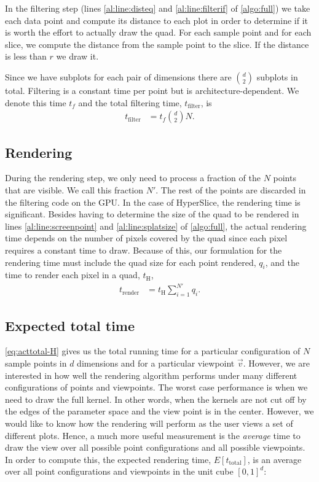 In the filtering step (lines \autoref{al:line:disteq} and 
\autoref{al:line:filterif} of \autoref{algo:full}) we take each data
point and compute its distance to each plot in order to determine if it is
worth the effort to actually draw the quad. For each sample point and for each
slice, we compute the distance from the sample point to the slice. If the
distance is less than $r$ we draw it.

Since we have subplots for each pair of dimensions there are
${d \choose 2}$ subplots in total. Filtering is a constant time per point
but is
architecture-dependent. We denote this time $t_f$ and the total 
filtering time, $t_\text{filter}$, is
\begin{align}
  t_\text{filter} &= t_f {d \choose 2} N \text{.}
\end{align}

\subsection{Rendering}
\label{rendering}

During the rendering step, we only need to process a fraction of the $N$ points
that are visible. We call this fraction $N'$. 
The rest of the points are discarded in the filtering
code on the GPU. In the case of HyperSlice,
the rendering time is significant. Besides having to determine the size of the
quad to be rendered in lines \autoref{al:line:screenpoint} and 
\autoref{al:line:splatsize} of \autoref{algo:full}, the actual rendering
time depends on the number of pixels covered by the quad since each pixel 
requires a constant time to draw. 
Because of this, our formulation for the 
rendering time 
must include the quad size for each point rendered, $q_i$, and
the time to render each pixel in a quad, $t_\text{H}$,
\begin{align}
  t_\text{render} &= t_\text{H} \sum_{i=1}^{N'} q_i \text{.}
\end{align}

\subsection{Expected total time}
\label{sec:expectedtotaltime}

\autoref{eq:acttotal-H} gives us the total running time for a
particular configuration of $N$ sample points in $d$ dimensions and for a particular
viewpoint $\vec{v}$. However, we are interested in how well the rendering
algorithm performs under many different configurations of points and 
viewpoints. 
The worst case performance is when we need to draw the full kernel.
In other words, when the kernels are not cut off by the edges
of the parameter space and the view point is in the center.
However, we would like to know how the rendering will
perform as the user views a set of different plots.
Hence, a much more
useful measurement is the \emph{average} time to draw the 
view over all possible point configurations and all
possible viewpoints.
In order to compute this, the expected rendering
time, $E[t_\text{total}]$, is an
average over all point configurations and viewpoints in the unit
cube $[0,1]^d$:

